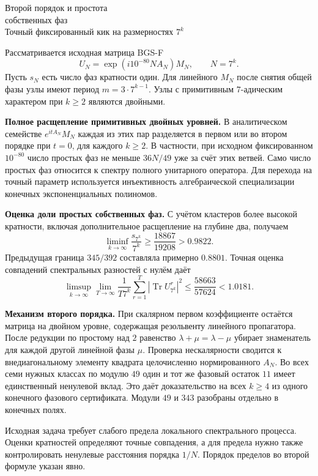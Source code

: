 \documentclass[11pt,a4paper]{article}
\newcommand{\Tr}{\operatorname{Tr}}
\newcommand{\subt}[1]{\par\medskip\noindent\textbf{#1.}\quad}
\begin{document}
\begin{center}{\LARGE\sffamily Второй порядок и простота\\[3pt]собственных фаз}\\[6pt]
{\large Точный фиксированный кик на размерностях \(7^k\)}
\end{center}
Рассматривается исходная матрица BGS-F
\[
    U_N=\exp(i10^{-80}N A_N)M_N,\qquad N=7^k.
\]
Пусть \(s_N\) есть число фаз кратности один. Для линейного \(M_N\) после снятия общей фазы узлы имеют период \(m=3\cdot7^{k-1}\). Узлы с примитивным \(7\)-адическим характером при \(k\ge2\) являются двойными.

\subt{Полное расщепление примитивных двойных уровней}
В аналитическом семействе \(e^{itA_N}M_N\) каждая из этих пар разделяется в первом или во втором порядке при \(t=0\), для каждого \(k\ge2\). В частности, при исходном фиксированном \(10^{-80}\) число простых фаз не меньше \(36N/49\) уже за счёт этих ветвей. Само число простых фаз относится к спектру полного унитарного оператора. Для перехода на точный параметр используется инъективность алгебраической специализации конечных экспоненциальных полиномов.

\subt{Оценка доли простых собственных фаз}
С учётом кластеров более высокой кратности, включая дополнительное расщепление на глубине два, получаем
\[
   \boxed{\displaystyle
   \liminf_{k\to\infty}\frac{s_{7^k}}{7^k}\ge
                    \frac{18867}{19208}>0.9822 .}
\]
Предыдущая граница \(345/392\) составляла примерно \(0.8801\). Точная оценка совпадений спектральных разностей с нулём даёт
\[
   \limsup_{k\to\infty}\lim_{T\to\infty}
        \frac1{T7^k}\sum_{r=1}^T|\Tr U_{7^k}^r|^2
             \le \frac{58663}{57624}<1.0181 .
\]

\subt{Механизм второго порядка}
При скалярном первом коэффициенте остаётся матрица на двойном уровне, содержащая резольвенту линейного пропагатора. После редукции по простому над \(2\) равенство \(\lambda+\mu=\lambda-\mu\) убирает знаменатель для каждой другой линейной фазы \(\mu\). Проверка нескалярности сводится к внедиагональному элементу квадрата целочисленно нормированного \(A_N\). Во всех семи нужных классах по модулю \(49\) один и тот же фазовый остаток \(11\) имеет единственный ненулевой вклад. Это даёт доказательство на всех \(k\ge4\) из одного конечного фазового сертификата. Модули \(49\) и \(343\) разобраны отдельно в конечных полях.

Исходная задача требует слабого предела локального спектрального процесса. Оценки кратностей определяют точные совпадения, а для предела нужно также контролировать ненулевые расстояния порядка \(1/N\). Порядок пределов во второй формуле указан явно.
\end{document}
